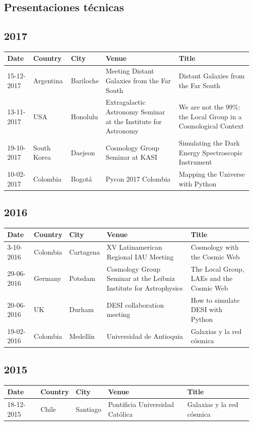 \documentclass{article}
\begin{document}
\subsection{Presentaciones t\'ecnicas}

\subsection*{2017}
\noindent
\begin{tabular}{p{2.0cm} p{1.5cm} p{1.5cm} p{5.0cm} p{5.0cm}}\hline
Date & Country & City& Venue & Title\\\hline
15-12-2017 & Argentina & Bariloche & Meeting Distant Galaxies from the Far South & Distant Galaxies from the Far South\\
13-11-2017 & USA & Honolulu & Extragalactic Astronomy Seminar at the Institute for Astronomy & We are not the 99\%: the Local Group in a Cosmological Context\\
19-10-2017 & South Korea & Daejeon & Cosmology Group Seminar at KASI & Simulating the Dark Energy Spectroscopic Instrument\\
10-02-2017 & Colombia & Bogot\'a & Pycon 2017 Colombia & Mapping the Universe with Python\\
\end{tabular}

\subsection*{2016}
\noindent
\begin{tabular}{p{2.0cm} p{1.5cm} p{1.5cm} p{5.0cm} p{5.0cm}}\hline
Date & Country & City& Venue & Title\\\hline
3-10-2016 & Colombia & Cartagena & XV Latinamerican Regional IAU Meeting & Cosmology with the Cosmic Web\\
29-06-2016 & Germany & Potsdam & Cosmology Group Seminar at the Leibniz Institute for Astrophysics & The Local Group, LAEs and the Cosmic Web\\
20-06-2016 & UK & Durham & DESI collaboration meeting & How to simulate DESI with Python\\
19-02-2016 & Colombia & Medell\'in & Universidad de Antioquia & Galaxias y la red c\'osmica\\
\end{tabular}

\subsection*{2015}
\noindent
\begin{tabular}{p{2.0cm} p{1.5cm} p{1.5cm} p{5.0cm} p{5.0cm}}\hline
Date & Country & City& Venue & Title\\\hline
18-12-2015 & Chile & Santiago & Pontificia Universidad Cat\'olica& Galaxias y la red c\'osmica \\
\end{tabular}
\end{document}

